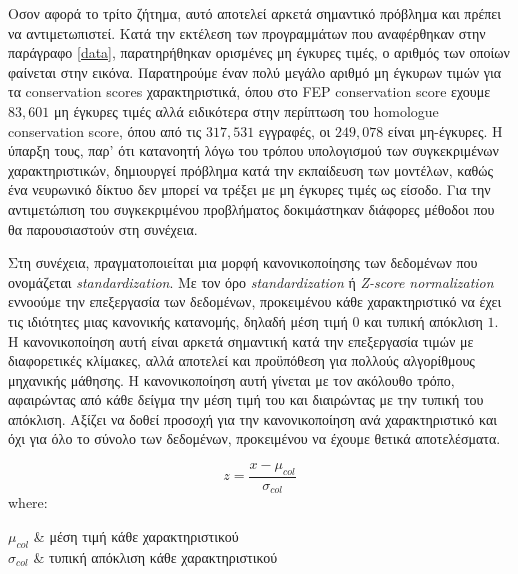Οσον αφορά το τρί\-το ζήτημα, αυτό αποτελεί αρκετά σημαντικό πρόβλημα και πρέπει να αντιμετωπιστεί. Κατά την εκτέλεση των προγραμμάτων που αναφέρθηκαν στην παράγραφο \ref{data}, παρατηρήθηκαν ορισμένες μη έγκυρες τιμές, ο αριθμός των οποίων φαίνεται στην εικόνα. Παρατηρούμε έναν πολύ μεγάλο αριθμό μη έγκυρων τιμών για τα conservation scores χαρακτηριστικά, όπου στο FEP conservation score εχουμε $83,601$ μη έγκυρες τιμές αλλά ειδικότερα στην περίπτωση του homologue conservation score, όπου από τις $317,531$ εγγραφές, οι $249,078$ είναι μη-έγκυρες. Η ύπαρξη τους, παρ' ότι κατανοητή λόγω του τρόπου υπολογισμού των συγκεκριμένων χαρακτηριστικών, δημιουργεί πρόβλημα κατά την εκπαίδευση των μοντέλων, καθώς ένα νευρωνικό δίκτυο δεν μπορεί να τρέξει με μη έγκυρες τιμές ως είσοδο. Για την αντιμετώπιση του συγκεκριμένου προβλήματος δοκιμάστηκαν διάφορες μέθοδοι που θα παρουσιαστούν στη συνέχεια.

\medskip
Στη συνέχεια, πραγματοποιείται μια μορφή κανονικοποίησης των δεδομένων που ονομάζεται \textit{standardization}. Με τον όρο \textit{standardization} ή \textit{Ζ-score normalization} εννοούμε την επεξεργασία των δεδομένων, προκειμένου κάθε χαρακτηριστικό να έχει τις ιδιότητες μιας κανονικής κατανομής, δηλαδή μέση τιμή $0$ και τυπική απόκλιση $1$. Η κανονικοποίηση αυτή είναι αρκετά σημαντική κατά την επεξεργασία τιμών με διαφορετικές κλίμακες, αλλά αποτελεί και προϋπόθεση για πολλούς αλγορίθμους μηχανικής μάθησης. Η κανονικοποίηση αυτή γίνεται με τον ακόλουθο τρόπο, αφαιρώντας από κάθε δείγμα την μέση τιμή του και διαιρώντας με την τυπική του απόκλιση. Αξίζει να δοθεί προσοχή για την κανονικοποίηση ανά χαρακτηριστικό και όχι για όλο το σύνολο των δεδομένων, προκειμένου να έχουμε θετικά αποτελέσματα.

{\Large
\begin{equation} \label{zscore}
    z = \frac{x- \mu_{col}}{\sigma_{col} }
\end{equation}}
where:


{\large
\centering
\begin{conditions}
$\mu_{col}$ & \quad μέση τιμή κάθε χαρακτηριστικού\\
$\sigma_{col}$ & \quad τυπική απόκλιση κάθε χαρακτηριστικού \\
\end{conditions}}


